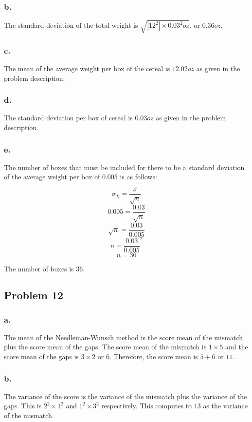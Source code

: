 \documentclass[11pt]{article}
\begin{document}
\subsubsection*{b.}
The standard deviation of the total weight is $\sqrt{|12^2|\times 0.03^2 oz}$, or $0.36 oz$.

\subsubsection*{c.}
The mean of the average weight per box of the cereal is $12.02 oz$ as given in the
problem description.

\subsubsection*{d.}
The standard deviation per box of cereal is $0.03 oz$ as given in the problem
description. 

\subsubsection*{e.}
The number of boxes that must be included for there to be a standard deviation
of the average weight per box of 0.005 is as follows:

\[ \sigma_{\overline{X}} = \frac{\sigma}{\sqrt{n}} \]
\[ 0.005 = \frac{0.03}{\sqrt{n}} \]
\[ \sqrt{n} = \frac{0.03}{0.005} \]
\[ n = \frac{0.03}{0.005}^2 \]
\[ n = 36 \]

The number of boxes is 36.


\subsection*{Problem 12}
\subsubsection*{a.}
The mean of the Needleman-Wunsch method is the score mean of the mismatch plus the
score mean of the gaps. The score mean of the mismatch is $1\times 5$ and the
score mean of the
gaps is $3 \times 2$ or $6$. Therefore, the score mean is $5 + 6$ or $11$. 

\subsubsection*{b.}
The variance of the score is the variance of the mismatch plus the variance of
the gaps. This is $2^2\times 1^2$ and $1^2\times 3^2$ respectively. This
computes to $13$ as the variance of the mismatch. 
\end{document}
